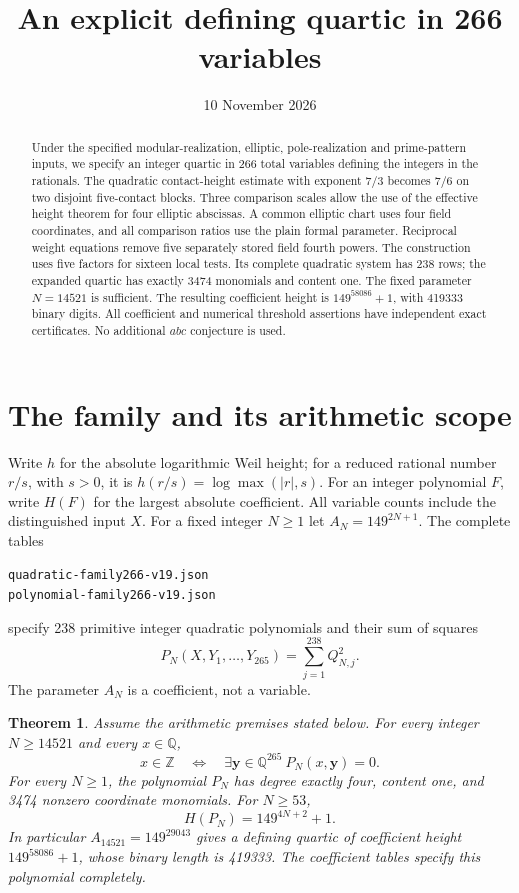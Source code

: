 \documentclass[11pt,a4paper]{article}
\title{An explicit defining quartic in 266 variables}
\author{}\date{10 November 2026}
\newtheorem{theorem}{Theorem}[section]\newtheorem{lemma}[theorem]{Lemma}
\newcommand{\Q}{\mathbb Q}\newcommand{\Z}{\mathbb Z}\newcommand{\HH}{\mathcal H}
\begin{document}
\maketitle
\begin{abstract}
Under the specified modular-realization, elliptic, pole-realization and
prime-pattern inputs, we specify an integer quartic in 266 total
variables defining the integers in the rationals. The quadratic
contact-height estimate with exponent $7/3$ becomes $7/6$ on two
disjoint five-contact blocks. Three comparison scales allow the use
of the effective height theorem for four elliptic abscissas. A common
elliptic chart uses four field coordinates, and all comparison ratios
use the plain formal parameter. Reciprocal weight equations remove
five separately stored field fourth powers. The construction uses five factors
for sixteen local tests. Its complete quadratic system has 238 rows;
the expanded quartic has exactly 3474 monomials and content one.
The fixed parameter $N=14521$ is sufficient. The resulting coefficient
height is $149^{58086}+1$, with 419333 binary digits. All coefficient
and numerical threshold assertions have independent exact
certificates. No additional $abc$ conjecture is used.
\end{abstract}

\section{The family and its arithmetic scope}
Write $h$ for the absolute logarithmic Weil height; for a reduced
rational number $r/s$, with $s>0$, it is
$h(r/s)=\log\max(|r|,s)$. For an integer polynomial $F$, write
$H(F)$ for the largest absolute coefficient. All variable counts
include the distinguished input $X$. For a fixed
integer $N\ge1$ let $A_N=149^{2N+1}$. The complete tables
\begin{center}\small
\nolinkurl{quadratic-family266-v19.json}\\
\nolinkurl{polynomial-family266-v19.json}
\end{center}
specify 238 primitive integer
quadratic polynomials and their sum of squares
\[
 P_N(X,Y_1,\ldots,Y_{265})=\sum_{j=1}^{238}Q_{N,j}^2.
\]
The parameter $A_N$ is a coefficient, not a variable.

\begin{theorem}\label{thm:main}
Assume the arithmetic premises stated below. For every integer
$N\ge14521$ and every $x\in\Q$,
\[
 x\in\Z\quad\Longleftrightarrow\quad
 \exists\mathbf y\in\Q^{265}\ P_N(x,\mathbf y)=0.
\]
For every $N\ge1$, the polynomial $P_N$ has degree exactly four,
content one, and 3474 nonzero coordinate monomials. For $N\ge53$,
\[
                       H(P_N)=149^{4N+2}+1.
\]
In particular $A_{14521}=149^{29043}$ gives a defining quartic of
coefficient height $149^{58086}+1$, whose binary length is 419333.
The coefficient tables specify this polynomial completely.
\end{theorem}
\end{document}
